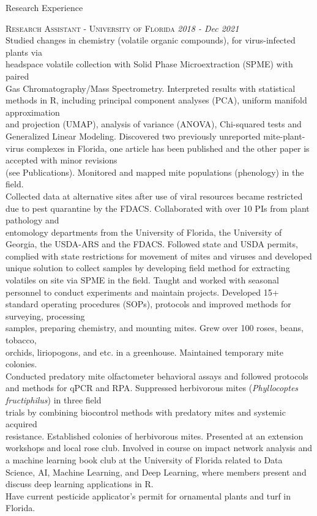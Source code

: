\documentclass{resume} %
\begin{document}
\newpage

\begin{rSection}{Research Experience}

\textsc{Research Assistant - University of Florida} \hfill {\em \textit{2018 - Dec 2021}}\\
Studied changes in chemistry (volatile organic compounds), for virus-infected plants via\\ headspace volatile collection with Solid Phase Microextraction (SPME) with paired\\
Gas Chromatography/Mass Spectrometry. Interpreted results with statistical methods in R, including principal component analyses (PCA), uniform manifold approximation\\
and projection (UMAP), analysis of variance (ANOVA), Chi-squared tests and Generalized Linear Modeling. Discovered two previously unreported mite-plant-virus complexes in Florida, one article has been published and the other paper is accepted with minor revisions\\ (see Publications). Monitored and mapped mite populations (phenology) in the field.\\
Collected data at alternative sites after use of viral resources became restricted due to pest quarantine by the FDACS. Collaborated with over 10 PIs from plant pathology and\\
entomology departments from the University of Florida, the University of Georgia, the USDA-ARS and the FDACS. Followed state and USDA permits, complied with state restrictions for movement of mites and viruses and developed unique solution to collect samples by developing field method for extracting volatiles on site via SPME in the field. Taught and worked with seasonal personnel to conduct experiments and maintain projects. Developed 15+ standard operating procedures (SOPs), protocols and improved methods for surveying, processing\\
samples, preparing chemistry, and mounting mites. Grew over 100 roses, beans, tobacco,\\ orchids, liriopogons, and etc. in a greenhouse. Maintained temporary mite colonies.\\
Conducted predatory mite olfactometer behavioral assays and followed
protocols and methods for qPCR and RPA.  Suppressed herbivorous mites (\textit{Phyllocoptes fructiphilus}) in three field\\
trials by combining biocontrol methods with predatory mites and systemic acquired\\ resistance. Established colonies of herbivorous mites. Presented at an extension workshops and local rose club. Involved in course on impact network analysis and a machine learning book club at the University of Florida related to Data Science, AI, Machine Learning, and Deep Learning, where members present and discuss deep learning applications in R. \\
Have current pesticide applicator's permit for ornamental plants and turf in Florida.
\hfill


\end{rSection}
\end{document}
